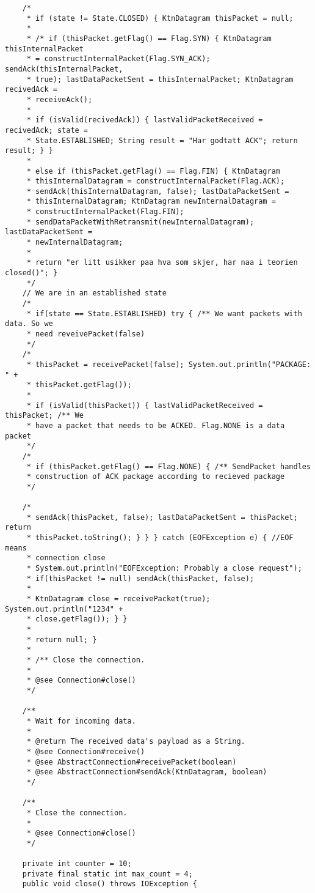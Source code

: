 \begin{lstlisting}
	/*
	 * if (state != State.CLOSED) { KtnDatagram thisPacket = null;
	 * 
	 * /* if (thisPacket.getFlag() == Flag.SYN) { KtnDatagram thisInternalPacket
	 * = constructInternalPacket(Flag.SYN_ACK); sendAck(thisInternalPacket,
	 * true); lastDataPacketSent = thisInternalPacket; KtnDatagram recivedAck =
	 * receiveAck();
	 * 
	 * if (isValid(recivedAck)) { lastValidPacketReceived = recivedAck; state =
	 * State.ESTABLISHED; String result = "Har godtatt ACK"; return result; } }
	 * 
	 * else if (thisPacket.getFlag() == Flag.FIN) { KtnDatagram
	 * thisInternalDatagram = constructInternalPacket(Flag.ACK);
	 * sendAck(thisInternalDatagram, false); lastDataPacketSent =
	 * thisInternalDatagram; KtnDatagram newInternalDatagram =
	 * constructInternalPacket(Flag.FIN);
	 * sendDataPacketWithRetransmit(newInternalDatagram); lastDataPacketSent =
	 * newInternalDatagram;
	 * 
	 * return "er litt usikker paa hva som skjer, har naa i teorien closed()"; }
	 */
	// We are in an established state
	/*
	 * if(state == State.ESTABLISHED) try { /** We want packets with data. So we
	 * need reveivePacket(false)
	 */
	/*
	 * thisPacket = receivePacket(false); System.out.println("PACKAGE: " +
	 * thisPacket.getFlag());
	 * 
	 * if (isValid(thisPacket)) { lastValidPacketReceived = thisPacket; /** We
	 * have a packet that needs to be ACKED. Flag.NONE is a data packet
	 */
	/*
	 * if (thisPacket.getFlag() == Flag.NONE) { /** SendPacket handles
	 * construction of ACK package according to recieved package
	 */

	/*
	 * sendAck(thisPacket, false); lastDataPacketSent = thisPacket; return
	 * thisPacket.toString(); } } } catch (EOFException e) { //EOF means
	 * connection close
	 * System.out.println("EOFException: Probably a close request");
	 * if(thisPacket != null) sendAck(thisPacket, false);
	 * 
	 * KtnDatagram close = receivePacket(true); System.out.println("1234" +
	 * close.getFlag()); } }
	 * 
	 * return null; }
	 * 
	 * /** Close the connection.
	 * 
	 * @see Connection#close()
	 */

	/**
	 * Wait for incoming data.
	 * 
	 * @return The received data's payload as a String.
	 * @see Connection#receive()
	 * @see AbstractConnection#receivePacket(boolean)
	 * @see AbstractConnection#sendAck(KtnDatagram, boolean)
	 */

	/**
	 * Close the connection.
	 * 
	 * @see Connection#close()
	 */
	
	private int counter = 10;
	private final static int max_count = 4;
	public void close() throws IOException {


\end{lstlisting}
